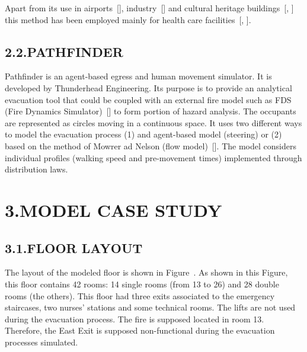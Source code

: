 \documentclass{style/llncs}
\begin{document}
Apart from its use in airports~[], industry~[] and cultural
heritage buildings~[, ] this method has been employed mainly for
health care facilities~[, ].%

\subsection{2.2.\hspace*{0.5em}PATHFINDER}\label{sec-pathfinder}%

\noindent{}Pathfinder is an agent-based egress and human movement simulator. It is
developed by Thunderhead Engineering. Its purpose is to provide an
analytical evacuation tool that could be coupled with an external fire
model such as FDS (Fire Dynamics Simulator)~[] to form portion of
hazard analysis. The occupants are represented as circles moving in a
continuous space. It uses two different ways to model the evacuation
process (1) and agent-based model (steering) or (2) based on the method
of Mowrer ad Nelson (flow model)~[]. The model considers individual
profiles (walking speed and pre-movement times) implemented through
distribution laws.%

\section{3.\hspace*{0.5em}MODEL CASE STUDY}\label{sec-model-case-study}%

\subsection{3.1.\hspace*{0.5em}FLOOR LAYOUT}\label{sec-floor-layout}%

\noindent{}The layout of the modeled floor is shown in Figure~. As
shown in this Figure, this floor contains 42 rooms: 14 single rooms (from
13 to 26) and 28 double rooms (the others). This floor had three exits
associated to the emergency staircases, two nurses' stations and some
technical rooms. The lifts are not used during the evacuation process.
The fire is supposed located in room 13. Therefore, the East Exit is
supposed non-functional during the evacuation processes simulated.%
\end{document}
